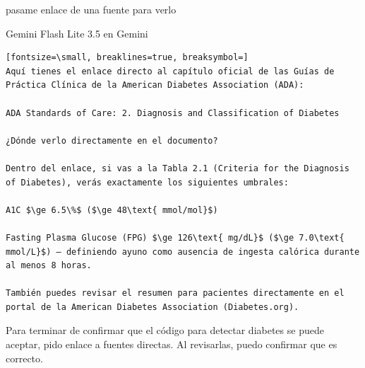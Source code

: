 \documentclass[12pt,a4paper,oneside]{book}
\begin{document}
\begin{iaprompt}
pasame enlace de una fuente para verlo
\end{iaprompt}
\begin{iaresp}{Gemini Flash Lite 3.5 en Gemini}
\begin{Verbatim}[fontsize=\small, breaklines=true, breaksymbol=]
Aquí tienes el enlace directo al capítulo oficial de las Guías de Práctica Clínica de la American Diabetes Association (ADA):

ADA Standards of Care: 2. Diagnosis and Classification of Diabetes

¿Dónde verlo directamente en el documento?

Dentro del enlace, si vas a la Tabla 2.1 (Criteria for the Diagnosis of Diabetes), verás exactamente los siguientes umbrales:

A1C $\ge 6.5\%$ ($\ge 48\text{ mmol/mol}$)

Fasting Plasma Glucose (FPG) $\ge 126\text{ mg/dL}$ ($\ge 7.0\text{ mmol/L}$) — definiendo ayuno como ausencia de ingesta calórica durante al menos 8 horas.

También puedes revisar el resumen para pacientes directamente en el portal de la American Diabetes Association (Diabetes.org).
\end{Verbatim}
\end{iaresp}
\begin{iaanalisis}
Para terminar de confirmar que el código para detectar diabetes se puede aceptar, pido enlace a fuentes directas. Al revisarlas, puedo confirmar que es correcto.
\end{iaanalisis}
\end{document}
